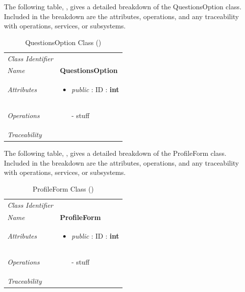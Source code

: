 \documentclass[12pt,letterpaper]{article}
\begin{document}
The following table, , gives a detailed breakdown of the QuestionsOption class. Included in the breakdown are the attributes, operations, and any traceability with operations, services, or subsystems.

\begin{table}[H]
    \caption{QuestionsOption Class ()} 
	\begin{tabu} to 
		\toprule
		Class Identifier &  \\
		Name & {\bf QuestionsOption} \\
		Attributes & 
		\begin{minipage}[t]{\linewidth}
		    \begin{itemize}
		        \item \textit{public} : ID : \bf{int}
			\end{itemize}
	    \end{minipage} \\

		Operations &
		\begin{minipage}[t]{\linewidth}
			\begin{enumerate}
			    \item[-] stuff
	        \end{enumerate}
	    \end{minipage} \\
	    	Traceability & \\
		\toprule
	\end{tabu}
\end{table}

The following table, , gives a detailed breakdown of the ProfileForm class. Included in the breakdown are the attributes, operations, and any traceability with operations, services, or subsystems.

\begin{table}[H]
    \caption{ProfileForm Class ()} 
	\begin{tabu} to 
		\toprule
		Class Identifier &  \\
		Name & {\bf ProfileForm} \\
		Attributes & 
		\begin{minipage}[t]{\linewidth}
		    \begin{itemize}
		        \item \textit{public} : ID : \bf{int}
			\end{itemize}
	    \end{minipage} \\

		Operations &
		\begin{minipage}[t]{\linewidth}
			\begin{enumerate}
			    \item[-] stuff
	        \end{enumerate}
	    \end{minipage} \\
	    	Traceability & \\
		\toprule
	\end{tabu}
\end{table}
\end{document}
